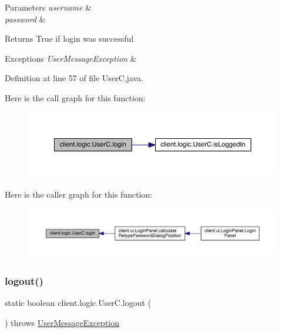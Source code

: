 \begin{DoxyParams}{Parameters}
{\em username} & \\
\hline
{\em password} & \\
\hline
\end{DoxyParams}
\begin{DoxyReturn}{Returns}
True if login was successful 
\end{DoxyReturn}

\begin{DoxyExceptions}{Exceptions}
{\em User\+Message\+Exception} & \\
\hline
\end{DoxyExceptions}


Definition at line 57 of file User\+C.\+java.

Here is the call graph for this function\+:
\nopagebreak
\begin{figure}[H]
\begin{center}
\leavevmode
\includegraphics[width=350pt]{classclient_1_1logic_1_1_user_c_aa3736b2a54be77a2b631ca49b9980a8c_cgraph}
\end{center}
\end{figure}
Here is the caller graph for this function\+:
\nopagebreak
\begin{figure}[H]
\begin{center}
\leavevmode
\includegraphics[width=350pt]{classclient_1_1logic_1_1_user_c_aa3736b2a54be77a2b631ca49b9980a8c_icgraph}
\end{center}
\end{figure}
\hypertarget{classclient_1_1logic_1_1_user_c_a6609a9ab9414bda2dd3a6685cdec3771}{}\label{classclient_1_1logic_1_1_user_c_a6609a9ab9414bda2dd3a6685cdec3771} 
\subsubsection{\texorpdfstring{logout()}{logout()}}
{\footnotesize\ttfamily static boolean client.\+logic.\+User\+C.\+logout (\begin{DoxyParamCaption}{ }\end{DoxyParamCaption}) throws \hyperlink{classpt_1_1up_1_1fe_1_1lpro1613_1_1sharedlib_1_1exceptions_1_1_user_message_exception}{User\+Message\+Exception}\hspace{0.3cm}{\ttfamily [static]}}

